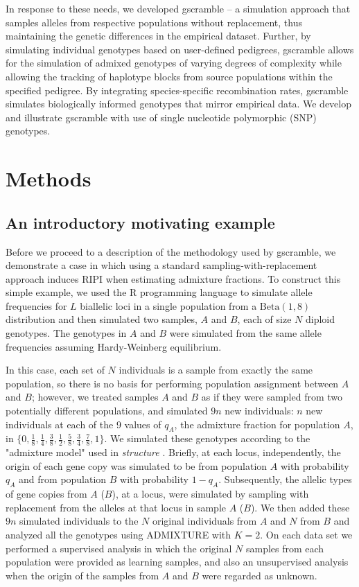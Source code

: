 	In response to these needs, we developed gscramble – a simulation approach that samples alleles from respective populations without replacement, thus maintaining the genetic differences in the empirical dataset.
	Further, by simulating individual genotypes based on user-defined pedigrees, gscramble allows for the simulation of admixed genotypes of varying degrees of complexity while allowing the tracking of haplotype blocks from source populations within the specified pedigree.
	By integrating species-specific recombination rates, gscramble simulates biologically informed genotypes that mirror empirical data.
	We develop and illustrate gscramble with use of single nucleotide polymorphic (SNP) genotypes.




\section*{Methods}

\subsection*{An introductory motivating example}

Before we proceed to a description of the methodology used by gscramble,
we demonstrate a case in which using a standard sampling-with-replacement
approach induces RIPI when estimating admixture fractions.
To construct this simple example, we used the R programming language \citep{Rcoreteam} to
simulate allele frequencies for $L$ biallelic
loci in a single population from a $\mathrm{Beta}(1, 8)$ distribution and then simulated
two samples, $A$ and $B$, each of size $N$ diploid genotypes. The genotypes in $A$ and $B$ were simulated
from the same allele frequencies assuming Hardy-Weinberg equilibrium.  

In this case,
each set of $N$ individuals is a sample from exactly the same population, so
there is no basis for performing population assignment between $A$ and $B$;
however, we treated samples $A$ and $B$ as if they were sampled from two potentially different
populations, and simulated $9n$ new individuals: $n$ new individuals at each of the 9 values of
$q_A$, the admixture fraction for population $A$, in  $\{0, \frac{1}{8}, \frac{1}{4}, \frac{3}{8}, \frac{1}{2}, \frac{5}{8}, \frac{3}{4}, \frac{7}{8}, 1\}$. We simulated these genotypes according to the "admixture model" used in {\em structure} \citep{pritchard2000inference}.  Briefly, at each locus, independently, the origin
of each gene copy was simulated to be from
population $A$ with probability $q_A$ and from population $B$ with probability $1-q_A$.  Subsequently,
the allelic types of gene copies from $A$ ($B$), at a locus, were simulated by sampling with replacement
from the alleles at that locus in sample $A$ ($B$).
We then added these $9n$ simulated individuals to the $N$ original individuals  from $A$ and $N$ from $B$
and analyzed all the genotypes using ADMIXTURE with $K=2$. On each data set we performed a supervised analysis in which the original $N$ samples from each
population were provided as learning samples, and also an
unsupervised analysis when the origin of the samples from $A$ and $B$ were regarded as unknown.

